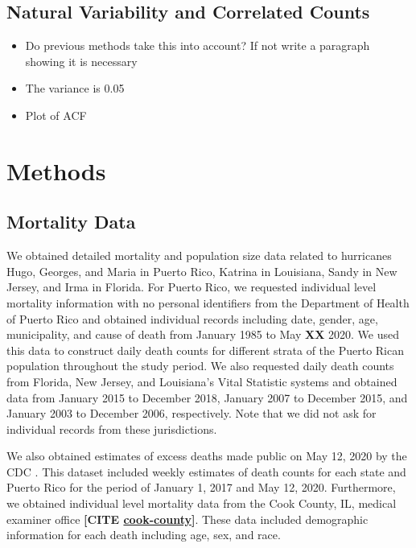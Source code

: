\documentclass[11pt]{article}
\begin{document}
\subsection{Natural Variability and Correlated Counts}
\label{subsec:natural-variability}
\begin{itemize}
    \item Do previous methods take this into account? If not write a paragraph showing it is necessary
    \item The variance is 0.05
    \item Plot of ACF
\end{itemize}

\section{Methods}
\label{sec:methods}

\subsection{Mortality Data}
\label{subsec:mortality-data}
We obtained detailed mortality and population size data related to hurricanes Hugo, Georges, and Maria in Puerto Rico, Katrina in Louisiana, Sandy in New Jersey, and Irma in Florida. For Puerto Rico, we requested individual level mortality information with no personal identifiers from the Department of Health of Puerto Rico and obtained individual records including date, gender, age, municipality, and cause of death from January 1985 to May \textbf{XX} 2020. We used this data to construct daily death counts for different strata of the Puerto Rican population throughout the study period. We also requested daily death counts from Florida, New Jersey, and Louisiana’s Vital Statistic systems and obtained data from January 2015 to December 2018, January 2007 to December 2015, and January 2003 to December 2006, respectively. Note that we did not ask for individual records from these jurisdictions.

We also obtained estimates of excess deaths made public on May 12, 2020 by the CDC \cite{cdc2020covid19}. This dataset included weekly estimates of death counts for each state and Puerto Rico for the period of January 1, 2017 and May 12, 2020. Furthermore, we obtained individual level mortality data from the Cook County, IL, medical examiner office \textbf{[CITE \href{https://www.cookcountyil.gov/agency/medical-examiner}{cook-county}]}. These data included demographic information for each death including age, sex, and race.
\end{document}
